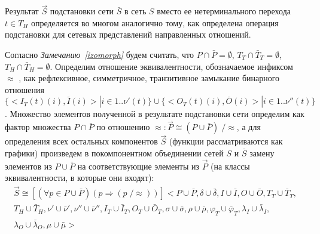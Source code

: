 		Результат  $ \vec{S} $    подстановки сети   $ \bar{S} $   в сеть   $ S $  вместо ее нетерминального перехода  $ t\in T_H $   
		определяется во многом аналогично тому, как определена операция подстановки для сетевых представлений направленных отношений.
		
		Согласно \textit{Замечанию~\ref{izomorph}} будем считать, что 
		$ P\cap\bar{P} = \emptyset $, 
		$ T_T\cap\bar{T}_T=\emptyset $, 
		$ T_H\cap \bar{T}_H=\emptyset $.
		Определим отношение эквивалентности, обозначаемое инфиксом $ \approx $ , как рефлексивное, симметричное, транзитивное замыкание бинарного отношения 
		$ \{ <I_T(t)(i),\bar{I}(i)>|i\in 1..\nu'(t) \} \cup \{<O_T(t)(i),\bar{O}(i)>|i \in 1..\nu''(t) \} $. 
		Множество элементов полученной в результате подстановки сети определим как фактор множества  $ P\cap\bar{P} $  по отношению  $ \approx : \vec{P}\cong(P\cup\bar{P})\;/\approx$, 
		а для определения всех остальных компонентов  $ \vec{S} $  (функции рассматриваются как графики) произведем в покомпонентном объединении сетей  $ S $   и $ \bar{S} $   
		замену элементов из $ P\cup\bar{P} $ на соответствующие элементы из  $ \vec{P} $  (на классы эквивалентности, в которые они входят):\\
		\begin{equation}
		\begin{multlined}
		\vec{S}\cong[(\forall p \in P \cup \bar{P} )(p\Rightarrow(p\; / \approx) )] 
		<P\cup\bar{P},\delta\cup\bar{\delta},I\cup\bar{I},O\cup\bar{O},T_T\cup\bar{T}_T,\\
		T_H\cup\bar{T}_H,\nu'\cup\bar{\nu}',\nu''\cup\bar{\nu}'',I_T\cup\bar{I}_T,
		O_T\cup\bar{O}_T,\sigma\cup\bar{\sigma},\rho\cup\bar{\rho},\varphi_T\cup\bar{\varphi}_T,
		\lambda_I\cup\bar{\lambda}_I,\\
		\lambda_O\cup\bar{\lambda}_O,\mu\cup\bar{\mu}>
		\end{multlined}
		\end{equation}
		
